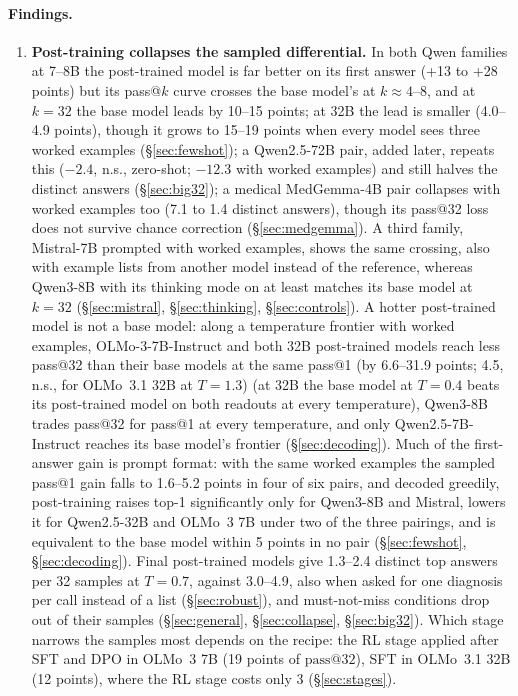 \documentclass[11pt]{article}
\makeatletter
\newcommand{\passk}[1]{\mathrm{pass@}#1}
\makeatother
\begin{document}
\paragraph{Findings.}
\begin{enumerate}
\item \textbf{Post-training collapses the sampled differential.} In both Qwen families at 7--8B the post-trained model is far better on its first answer (+13 to +28 points) but its pass@$k$ curve crosses the base model's at $k{\approx}4$--8, and at $k{=}32$ the base model leads by 10--15 points; at 32B the lead is smaller (4.0--4.9 points), though it grows to 15--19 points when every model sees three worked examples (\S\ref{sec:fewshot}); a Qwen2.5-72B pair, added later, repeats this ($-2.4$, n.s., zero-shot; $-12.3$ with worked examples) and still halves the distinct answers (\S\ref{sec:big32}); a medical MedGemma-4B pair collapses with worked examples too (7.1 to 1.4 distinct answers), though its pass@32 loss does not survive chance correction (\S\ref{sec:medgemma}). A third family, Mistral-7B prompted with worked examples, shows the same crossing, also with example lists from another model instead of the reference, whereas Qwen3-8B with its thinking mode on at least matches its base model at $k{=}32$ (\S\ref{sec:mistral}, \S\ref{sec:thinking}, \S\ref{sec:controls}). A hotter post-trained model is not a base model: along a temperature frontier with worked examples, OLMo-3-7B-Instruct and both 32B post-trained models reach less pass@32 than their base models at the same pass@1 (by 6.6--31.9 points; 4.5, n.s., for OLMo~3.1 32B at $T{=}1.3$) (at 32B the base model at $T{=}0.4$ beats its post-trained model on both readouts at every temperature), Qwen3-8B trades pass@32 for pass@1 at every temperature, and only Qwen2.5-7B-Instruct reaches its base model's frontier (\S\ref{sec:decoding}). Much of the first-answer gain is prompt format: with the same worked examples the sampled pass@1 gain falls to 1.6--5.2 points in four of six pairs, and decoded greedily, post-training raises top-1 significantly only for Qwen3-8B and Mistral, lowers it for Qwen2.5-32B and OLMo~3 7B under two of the three pairings, and is equivalent to the base model within 5 points in no pair (\S\ref{sec:fewshot}, \S\ref{sec:decoding}). Final post-trained models give 1.3--2.4 distinct top answers per 32 samples at $T{=}0.7$, against 3.0--4.9, also when asked for one diagnosis per call instead of a list (\S\ref{sec:robust}), and must-not-miss conditions drop out of their samples (\S\ref{sec:general}, \S\ref{sec:collapse}, \S\ref{sec:big32}). Which stage narrows the samples most depends on the recipe: the RL stage applied after SFT and DPO in OLMo~3 7B (19 points of $\passk{32}$), SFT in OLMo~3.1 32B (12 points), where the RL stage costs only 3 (\S\ref{sec:stages}).

\end{enumerate}
\end{document}
